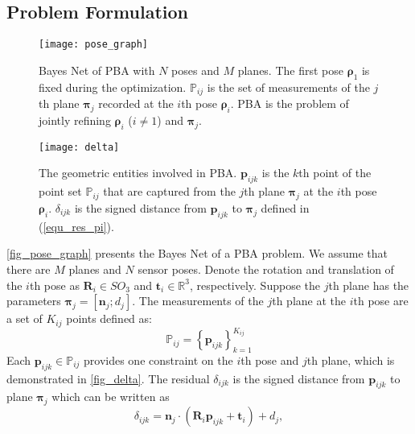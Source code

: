 \documentclass{vgtc}                          %
\begin{document}
\subsection{Problem Formulation}

\begin{figure}[tb]
	\centering %
	\texttt{[image: pose\_graph]}
	\caption{Bayes Net of PBA with $N$ poses and $M$ planes. The first pose $\bm{\rho}_{1}$ is fixed during the optimization. $\mathbb{P}_{ij}$ is the set of measurements of the $j$th plane $\bm{\pi}_{j}$ recorded at the $i$th pose $\bm{\rho}_{i}$. PBA is the problem of jointly refining $\bm{\rho}_{i}$ ($i \neq 1$) and $\bm{\pi}_{j}$.} 
	\label{fig_pose_graph}
\end{figure}

\begin{figure}[tb]
	\centering 
	\texttt{[image: delta]}
	\caption{The geometric entities involved in PBA. %
		$\mathbf{p}_{ijk}$ is the $k$th point of the point set $\mathbb{P}_{ij}$ that  are captured from the $j$th plane $\bm{\pi}_{j}$   at the $i$th pose $\bm{\rho}_{i}$. $\delta_{ijk}$ is the signed distance from  $\mathbf{p}_{ijk}$ to   $\bm{\pi}_{j}$  defined in  (\ref{equ_res_pi}).} 
	\label{fig_delta}
\end{figure}

\autoref{fig_pose_graph} presents the Bayes Net of a PBA problem. We assume that there are $M$ planes and  $N$ sensor poses. Denote the rotation and translation of the $i$th pose as $\mathbf{R}_i \in SO_3$ and $\mathbf{t}_i \in \mathbb{R}^3$, respectively.  Suppose the $j$th plane has the parameters  $\bm{\pi}_j = \left[ \mathbf{n}_{j}; d_j\right]$. %
The measurements of the $j$th plane at the $i$th pose are a set of $K_{ij}$ points defined as:%
\begin{equation}
	\mathbb{P}_{ij} = \left\lbrace \mathbf{p}_{ijk}\right\rbrace _{k=1}^{K_{ij}}
\end{equation}
Each $\mathbf{p}_{ijk} \in \mathbb{P}_{ij}$ provides one constraint on the $i$th pose and $j$th plane, which is demonstrated in \autoref{fig_delta}.  The residual   $\delta_{ijk}$ is the signed distance from $\mathbf{p}_{ijk}$ to plane $\bm{\pi}_j$ which can be  written as%
\begin{equation} \label{equ_res_pi}
	\delta_{ijk} = \mathbf{n}_{j} \cdot \left( \mathbf{R}_i\mathbf{p}_{ijk} + \mathbf{t}_i\right)  + d_j,
\end{equation}
\end{document}
